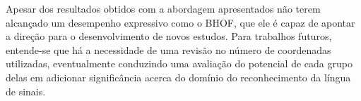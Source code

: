 Apesar dos resultados obtidos com a abordagem apresentados não terem alcançado um desempenho expressivo como o BHOF, que ele é capaz de apontar a direção para o desenvolvimento de novos estudos. Para trabalhos futuros, entende-se que há a necessidade de uma revisão no número de coordenadas utilizadas, eventualmente conduzindo uma avaliação do potencial de cada grupo delas em adicionar significância acerca do domínio do reconhecimento da língua de sinais.






